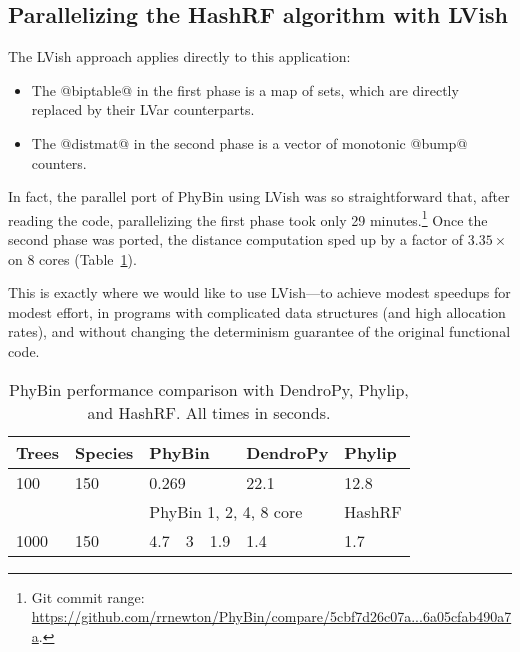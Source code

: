 \subsection{Parallelizing the HashRF algorithm with LVish}


The LVish approach applies directly to this application: 
\begin{itemize}
\item The @biptable@ in the first phase is a map of sets, which are
  directly replaced by their LVar counterparts.
\item The @distmat@ in the second phase is a vector of monotonic
      @bump@ counters.
\end{itemize}

In fact, the parallel port of PhyBin using LVish was so
straightforward that, after reading the code, parallelizing the first
phase took only 29 minutes.\footnote{Git commit range:
  \url{https://github.com/rrnewton/PhyBin/compare/5cbf7d26c07a...6a05cfab490a7a}.}
Once the second phase was ported, the distance computation sped up by
a factor of $3.35\times$ on 8 cores (Table~\ref{t:phybin-bench}).

This is exactly where we would like to use LVish---to achieve modest
speedups for modest effort, in programs with complicated data
structures (and high allocation rates), and without changing the
determinism guarantee of the original functional code.

\begin{table}
\begin{tabular}{| l | l | l | l | l | l | l |}
\hline
Trees     & Species    & \multicolumn{3}{|l|}{PhyBin} & DendroPy & Phylip \\ \hline
100       & 150        & \multicolumn{3}{|l|}{0.269}  & 22.1     & 12.8   \\ \hline
          &            & \multicolumn{4}{|l|}{PhyBin 1, 2, 4, 8 core} & HashRF \\ \hline
1000      & 150        & 4.7      & 3     & 1.9     & 1.4      & 1.7      \\ \hline
\end{tabular}
\caption{PhyBin performance comparison with DendroPy, Phylip, and HashRF.  All
  times in seconds.}
\label{t:phybin-bench}
\end{table}
